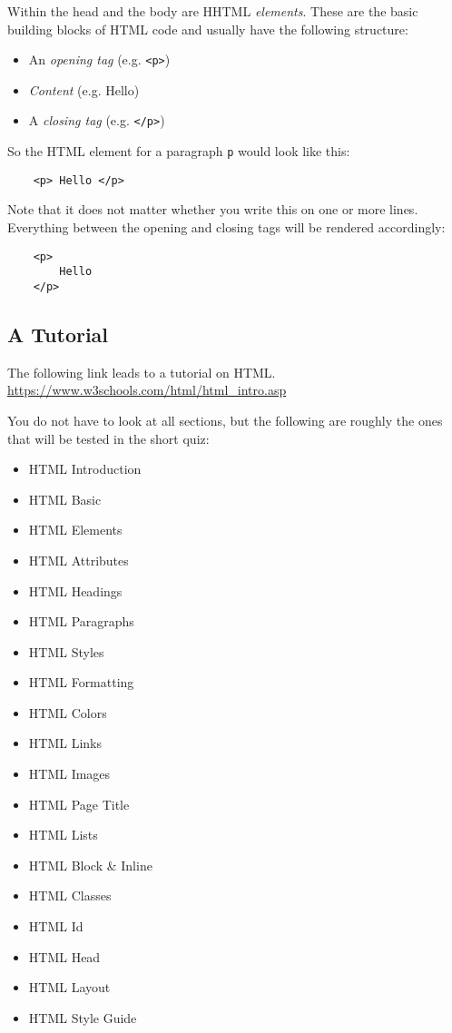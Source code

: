 \documentclass[english,11pt,a4paper]{report}
\begin{document}
Within the head and the body are HHTML \emph{elements}. These are the basic building blocks of HTML code and usually have the following structure: 
\begin{itemize}
    \item An \emph{opening tag} (e.g. \lstinline|<p>|)
    \item \emph{Content} (e.g. Hello)
    \item A \emph{closing tag} (e.g. \lstinline|</p>|)
\end{itemize}

So the HTML element for a paragraph \lstinline|p| would look like this:
\begin{lstlisting}
    <p> Hello </p>
\end{lstlisting}
Note that it does not matter whether you write this on one or more lines. Everything between the opening and closing tags will be rendered accordingly:
\begin{lstlisting}
    <p> 
        Hello 
    </p>
\end{lstlisting}

\subsection{A Tutorial}
The following link leads to a tutorial on HTML. \\
\url{https://www.w3schools.com/html/html_intro.asp} 

You do not have to look at all sections, but the following are roughly the ones that will be tested in the short quiz:
\begin{itemize}
    \item HTML Introduction
    \item HTML Basic
    \item HTML Elements
    \item HTML Attributes
    \item HTML Headings
    \item HTML Paragraphs
    \item HTML Styles
    \item HTML Formatting
    \item HTML Colors
    \item HTML Links
    \item HTML Images
    \item HTML Page Title
    \item HTML Lists
    \item HTML Block \& Inline
    \item HTML Classes
    \item HTML Id
    \item HTML Head
    \item HTML Layout
    \item HTML Style Guide
\end{itemize}
\end{document}
